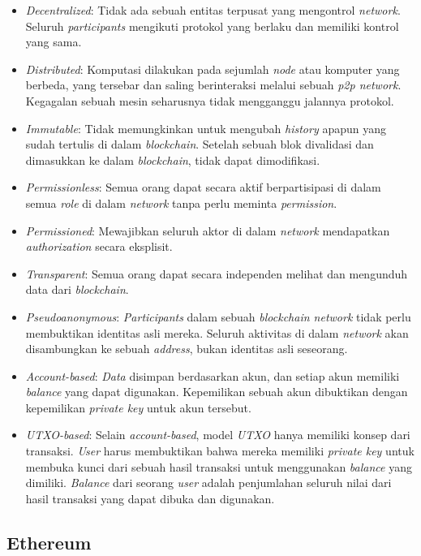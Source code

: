 \begin{itemize}
	\item \textit{Decentralized}: Tidak ada sebuah entitas terpusat yang mengontrol \textit{network}. Seluruh \textit{participants} mengikuti protokol yang berlaku dan memiliki kontrol yang sama.
	\item \textit{Distributed}: Komputasi dilakukan pada sejumlah \textit{node} atau komputer yang berbeda, yang tersebar dan saling berinteraksi melalui sebuah \textit{p2p network}. Kegagalan sebuah mesin seharusnya tidak mengganggu jalannya protokol.
	\item \textit{Immutable}: Tidak memungkinkan untuk mengubah \textit{history} apapun yang sudah tertulis di dalam \textit{blockchain}. Setelah sebuah blok divalidasi dan dimasukkan ke dalam \textit{blockchain}, tidak dapat dimodifikasi.
	\item \textit{Permissionless}: Semua orang dapat secara aktif berpartisipasi di dalam semua \textit{role} di dalam \textit{network} tanpa perlu meminta \textit{permission}.
	\item \textit{Permissioned}: Mewajibkan seluruh aktor di dalam \textit{network} mendapatkan \textit{authorization} secara eksplisit.
	\item \textit{Transparent}: Semua orang dapat secara independen melihat dan mengunduh data dari \textit{blockchain}.
	\item \textit{Pseudoanonymous}: \textit{Participants} dalam sebuah \textit{blockchain network} tidak perlu membuktikan identitas asli mereka. Seluruh aktivitas di dalam \textit{network} akan disambungkan ke sebuah \textit{address}, bukan identitas asli seseorang.
	\item \textit{Account-based}: \textit{Data} disimpan berdasarkan akun, dan setiap akun memiliki \textit{balance} yang dapat digunakan. Kepemilikan sebuah akun dibuktikan dengan kepemilikan \textit{private key} untuk akun tersebut.
	\item \textit{UTXO-based}: Selain \textit{account-based}, model \textit{UTXO} hanya memiliki konsep dari transaksi. \textit{User} harus membuktikan bahwa mereka memiliki \textit{private key} untuk membuka kunci dari sebuah hasil transaksi untuk menggunakan \textit{balance} yang dimiliki. \textit{Balance} dari seorang \textit{user} adalah penjumlahan seluruh nilai dari hasil transaksi yang dapat dibuka dan digunakan.
\end{itemize}

\subsection{Ethereum}
\label{subsec:ethereum}




